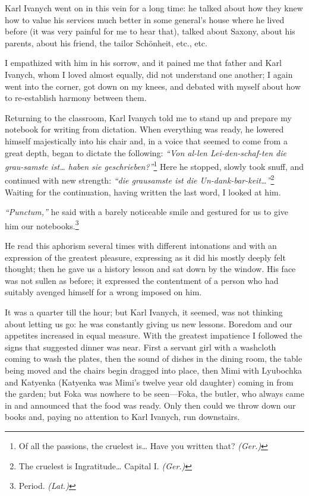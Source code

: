 Karl Ivanych went on in this vein for a long time: he talked about how they knew how to value his services much better in some general's house where he lived before (it was very painful for me to hear that), talked about Saxony, about his parents, about his friend, the tailor Sch\"onheit, etc., etc.

I empathized with him in his sorrow, and it pained me that father and Karl Ivanych, whom I loved almost equally, did not understand one another; I again went into the corner, got down on my knees, and debated with myself about how to re-establish harmony between them.

Returning to the classroom, Karl Ivanych told me to stand up and prepare my notebook for writing from dictation. When everything was ready, he lowered himself majestically into his chair and, in a voice that seemed to come from a great depth, began to dictate the following: \textit{``Von al-len Lei-den-schaf-ten die grau-samste ist\ldots{} haben sie geschrieben?''}\footnote{Of all the passions, the cruelest is\ldots{} Have you written that? \textit{(Ger.)}} Here he stopped, slowly took snuff, and continued with new strength: \textit{``die grausamste ist die Un-dank-bar-keit\ldots{}''}\footnote{The cruelest is Ingratitude\ldots{} Capital I. \textit{(Ger.)}} Waiting for the continuation, having written the last word, I looked at him. %

\textit{``Punctum,''} he said with a barely noticeable smile and gestured for us to give him our notebooks.\footnote{Period. \textit{(Lat.)}} %

He read this aphorism several times with different intonations and with an expression of the greatest pleasure, expressing as it did his mostly deeply felt thought; then he gave us a history lesson and sat down by the window. His face was not sullen as before; it expressed the contentment of a person who had suitably avenged himself for a wrong imposed on him.

It was a quarter till the hour; but Karl Ivanych, it seemed, was not thinking about letting us go: he was constantly giving us new lessons. Boredom and our appetites increased in equal measure. With the greatest impatience I followed the signs that suggested dinner was near. First a servant girl with a washcloth coming to wash the plates, then the sound of dishes in the dining room, the table being moved and the chairs begin dragged into place, then Mimi with Lyubochka and Katyenka (Katyenka was Mimi's twelve year old daughter) coming in from the garden; but Foka was nowhere to be seen---Foka, the butler, who always came in and announced that the food was ready. Only then could we throw down our books and, paying no attention to Karl Ivanych, run downstairs.


